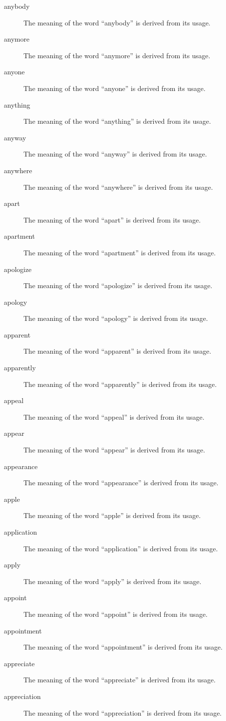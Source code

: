 \documentclass[12pt, letterpaper]{memoir}
\begin{document}
\begin{description}
\item[anybody] The meaning of the word ``anybody'' is derived from its usage.
\item[anymore] The meaning of the word ``anymore'' is derived from its usage.
\item[anyone] The meaning of the word ``anyone'' is derived from its usage.
\item[anything] The meaning of the word ``anything'' is derived from its usage.
\item[anyway] The meaning of the word ``anyway'' is derived from its usage.
\item[anywhere] The meaning of the word ``anywhere'' is derived from its usage.
\item[apart] The meaning of the word ``apart'' is derived from its usage.
\item[apartment] The meaning of the word ``apartment'' is derived from its usage.
\item[apologize] The meaning of the word ``apologize'' is derived from its usage.
\item[apology] The meaning of the word ``apology'' is derived from its usage.
\item[apparent] The meaning of the word ``apparent'' is derived from its usage.
\item[apparently] The meaning of the word ``apparently'' is derived from its usage.
\item[appeal] The meaning of the word ``appeal'' is derived from its usage.
\item[appear] The meaning of the word ``appear'' is derived from its usage.
\item[appearance] The meaning of the word ``appearance'' is derived from its usage.
\item[apple] The meaning of the word ``apple'' is derived from its usage.
\item[application] The meaning of the word ``application'' is derived from its usage.
\item[apply] The meaning of the word ``apply'' is derived from its usage.
\item[appoint] The meaning of the word ``appoint'' is derived from its usage.
\item[appointment] The meaning of the word ``appointment'' is derived from its usage.
\item[appreciate] The meaning of the word ``appreciate'' is derived from its usage.
\item[appreciation] The meaning of the word ``appreciation'' is derived from its usage.

\end{description}
\end{document}
